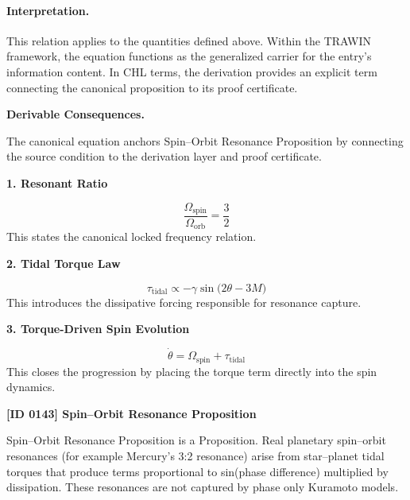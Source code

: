 \paragraph{Interpretation.}
This relation applies to the quantities defined above. Within the TRAWIN framework, the equation functions as the generalized carrier for the entry’s information content. In CHL terms, the derivation provides an explicit term connecting the canonical proposition to its proof certificate.

\par\vspace{0.35em}
\noindent\textbf{Derivable Consequences.}\quad
\begingroup
\footnotesize
\raggedright
The canonical equation anchors Spin--Orbit Resonance Proposition by connecting the source condition to the derivation layer and proof certificate.
\par\endgroup

\noindent\textbf{1. Resonant Ratio}\par
\[
\frac{\Omega_{\mathrm{spin}}}{\Omega_{\mathrm{orb}}}=\frac{3}{2}
\]
\noindent This states the canonical locked frequency relation.\par
\noindent\textbf{2. Tidal Torque Law}\par
\[
\tau_{\mathrm{tidal}}\propto -\gamma \sin\!\bigl(2\theta-3M\bigr)
\]
\noindent This introduces the dissipative forcing responsible for resonance capture.\par
\noindent\textbf{3. Torque-Driven Spin Evolution}\par
\[
\dot{\theta}=\Omega_{\mathrm{spin}}+\tau_{\mathrm{tidal}}
\]
\noindent This closes the progression by placing the torque term directly into the spin dynamics.\par

\clearpage
\noindent\textbf{[ID 0143] Spin--Orbit Resonance Proposition}\par
\vspace{0.35em}
\begingroup\small
{}
Spin--Orbit Resonance Proposition is a Proposition. Real planetary spin--orbit resonances (for example Mercury's 3:2 resonance) arise from star--planet tidal torques that produce terms proportional to sin(phase difference) multiplied by dissipation. These resonances are not captured by phase only Kuramoto models.

